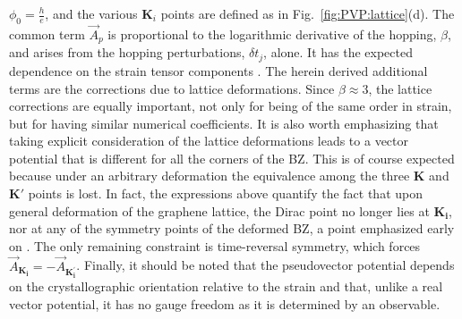 $\phi_0=\frac{h}{e}$, and the various $\bm{K}_i$ points are defined as in Fig.~\ref{fig:PVP:lattice}(d).
The common term $\vec{A}_p$ is proportional to the logarithmic derivative of the hopping, $\beta$, and arises from the hopping perturbations, $\delta t_j$, alone.
It has the expected dependence on the strain tensor components \cite{CastroNeto2009,Vozmediano2010}. 
The herein derived additional terms are the corrections due to lattice deformations.
Since $\beta \approx 3$, the lattice corrections are equally important, not only for being of the same order in strain, but for having similar numerical coefficients.
It is also worth emphasizing that taking explicit consideration of the lattice deformations leads to a vector potential that is different for all the corners of the BZ.
This is of course expected because under an arbitrary deformation the equivalence among the three $\bm{K}$ and $\bm{K'}$ points is lost.
In fact, the expressions above quantify the fact that upon general deformation of the graphene lattice, the Dirac point no longer lies at $\bm{K_i}$, nor at any of the symmetry points of the deformed BZ, a point emphasized early on \cite{Pereira2009}.
The only remaining constraint is time-reversal symmetry, which forces $\vec{A}_{\bm{K_i}} = - \vec{A}_{\bm{K_i^\prime}}$.
Finally, it should be noted that the pseudovector potential depends on the crystallographic orientation relative to the strain and that, unlike a real vector potential, it has no gauge freedom as it is determined by an observable.

